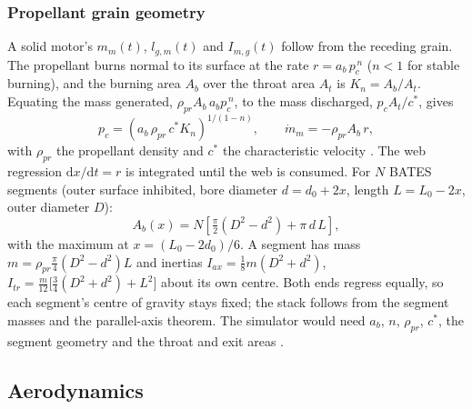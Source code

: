 \subsubsection{Propellant grain geometry}\label{sec:mass_grain}
A solid motor's $m_m(t)$, $l_{g,m}(t)$ and $I_{m,g}(t)$ follow from the receding grain. The
propellant burns normal to its surface at the rate $r=a_b\,p_c^{\,n}$ ($n<1$ for stable burning),
and the burning area $A_b$ over the throat area $A_t$ is $K_n=A_b/A_t$. Equating the mass generated,
$\rho_{pr}A_b\,a_bp_c^{\,n}$, to the mass discharged, $p_cA_t/c^*$, gives
\begin{equation} \label{eq:grain_pressure}
    p_c = \left(a_b\,\rho_{pr}\,c^*K_n\right)^{1/(1-n)}, \qquad
    \dot m_m = -\rho_{pr}A_b\,r,
\end{equation}
with $\rho_{pr}$ the propellant density and $c^*$ the characteristic velocity \cite{nakka}. The web
regression $\mathrm{d}x/\mathrm{d}t=r$ is integrated until the web is consumed. For $N$ BATES
segments (outer surface inhibited, bore diameter $d=d_0+2x$, length $L=L_0-2x$, outer diameter $D$):
\begin{equation} \label{eq:grain_bates}
    A_b(x) = N\left[\tfrac{\pi}{2}\left(D^2-d^2\right) + \pi\,d\,L\right],
\end{equation}
with the maximum at $x=(L_0-2d_0)/6$. A segment has mass $m=\rho_{pr}\tfrac{\pi}{4}(D^2-d^2)L$ and
inertias $I_{ax}=\tfrac18 m(D^2+d^2)$, $I_{tr}=\tfrac{m}{12}\bigl[\tfrac34(D^2+d^2)+L^2\bigr]$ about
its own centre. Both ends regress equally, so each segment's centre of gravity stays fixed; the
stack follows from the segment masses and the parallel-axis theorem. The simulator would need
$a_b$, $n$, $\rho_{pr}$, $c^*$, the segment geometry and the throat and exit areas \cite{openmotor}.

\subsection{Aerodynamics}\label{sec:aero}
